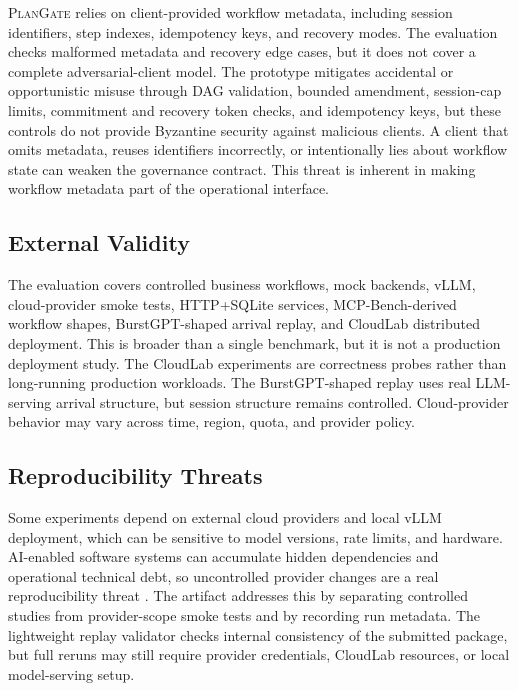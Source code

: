 \documentclass[5p,times]{elsarticle}
\newcommand{\plangate}{\textsc{PlanGate}\xspace}
\begin{document}
\plangate relies on client-provided workflow metadata, including session identifiers, step indexes, idempotency keys, and recovery modes. The evaluation checks malformed metadata and recovery edge cases, but it does not cover a complete adversarial-client model. The prototype mitigates accidental or opportunistic misuse through DAG validation, bounded amendment, session-cap limits, commitment and recovery token checks, and idempotency keys, but these controls do not provide Byzantine security against malicious clients. A client that omits metadata, reuses identifiers incorrectly, or intentionally lies about workflow state can weaken the governance contract. This threat is inherent in making workflow metadata part of the operational interface.

\subsection{External Validity}

The evaluation covers controlled business workflows, mock backends, vLLM, cloud-provider smoke tests, HTTP+SQLite services, MCP-Bench-derived workflow shapes, BurstGPT-shaped arrival replay, and CloudLab distributed deployment. This is broader than a single benchmark, but it is not a production deployment study. The CloudLab experiments are correctness probes rather than long-running production workloads. The BurstGPT-shaped replay uses real LLM-serving arrival structure, but session structure remains controlled. Cloud-provider behavior may vary across time, region, quota, and provider policy.

\subsection{Reproducibility Threats}

Some experiments depend on external cloud providers and local vLLM deployment, which can be sensitive to model versions, rate limits, and hardware. AI-enabled software systems can accumulate hidden dependencies and operational technical debt, so uncontrolled provider changes are a real reproducibility threat \citep{sculley2015technicaldebt}. The artifact addresses this by separating controlled studies from provider-scope smoke tests and by recording run metadata. The lightweight replay validator checks internal consistency of the submitted package, but full reruns may still require provider credentials, CloudLab resources, or local model-serving setup.
\end{document}

